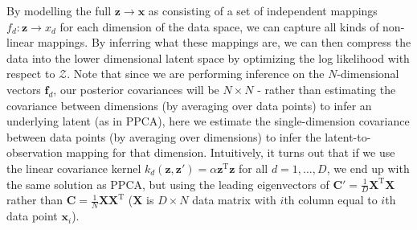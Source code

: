 \documentclass[a4paper]{article}
\begin{document}
By modelling the full $\mathbf{z}\rightarrow \mathbf{x}$ as consisting of a set of independent mappings $f_d:\mathbf{z}\rightarrow x_d$ for each dimension of the data space, we can capture all kinds of non-linear mappings. By inferring what these mappings are, we can then compress the data into the lower dimensional latent space by optimizing the log likelihood with respect to $\mathcal{Z}$. Note that since we are performing inference on the $N$-dimensional vectors $\mathbf{f}_d$, our posterior covariances will be $N\times N$ - rather than estimating the covariance between dimensions (by averaging over data points) to infer an underlying latent (as in PPCA), here we estimate the single-dimension covariance between data points (by averaging over dimensions) to infer the latent-to-observation mapping for that dimension. Intuitively, it turns out that if we use the linear covariance kernel $k_d(\mathbf{z},\mathbf{z}') = \alpha \mathbf{z}^\textrm{T}\mathbf{z}$ for all $d=1,\ldots,D$, we end up with the same solution as PPCA, but using the leading eigenvectors of $\mathbf{C}' = \frac{1}{D}\mathbf{X}^\textrm{T}\mathbf{X}$ rather than $\mathbf{C} = \frac{1}{N}\mathbf{XX}^\textrm{T}$ ($\mathbf{X}$ is $D\times N$ data matrix with $i$th column equal to $i$th data point $\mathbf{x}_i$).
\end{document}
